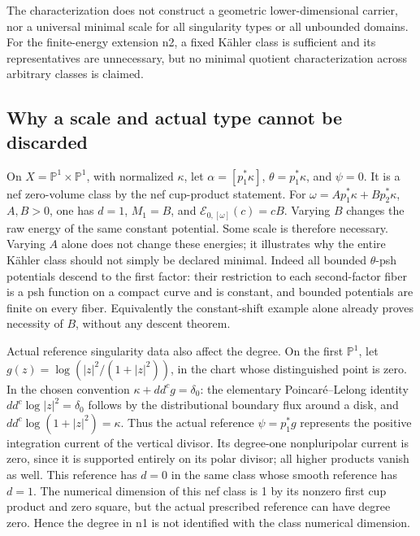 \documentclass[
  11pt,
]{article}
\begin{document}
The characterization does not construct a geometric lower-dimensional
carrier, nor a universal minimal scale for all singularity types or all
unbounded domains. For the finite-energy extension n2, a fixed Kähler
class is sufficient and its representatives are unnecessary, but no
minimal quotient characterization across arbitrary classes is claimed.

\subsection{Why a scale and actual type cannot be
discarded}\label{why-a-scale-and-actual-type-cannot-be-discarded}

On \(X=\mathbb{P}^1\times\mathbb{P}^1\), with normalized \(\kappa\), let
\(\alpha=[p_1^*\kappa]\), \(\theta=p_1^*\kappa\), and \(\psi=0\). It is
a nef zero-volume class by the nef cup-product statement. For
\(\omega=A p_1^*\kappa+B p_2^*\kappa\), \(A,B>0\), one has \(d=1\),
\(M_1=B\), and \(\mathcal{E}_{0,[\omega]}(c)=cB\). Varying \(B\) changes
the raw energy of the same constant potential. Some scale is therefore
necessary. Varying \(A\) alone does not change these energies; it
illustrates why the entire Kähler class should not simply be declared
minimal. Indeed all bounded \(\theta\)-psh potentials descend to the
first factor: their restriction to each second-factor fiber is a psh
function on a compact curve and is constant, and bounded potentials are
finite on every fiber. Equivalently the constant-shift example alone
already proves necessity of \(B\), without any descent theorem.

Actual reference singularity data also affect the degree. On the first
\(\mathbb{P}^1\), let \(g(z)=\log(|z|^2/(1+|z|^2))\), in the chart whose
distinguished point is zero. In the chosen convention
\(\kappa+dd^cg=\delta_0\): the elementary Poincaré--Lelong identity
\(dd^c\log|z|^2=\delta_0\) follows by the distributional boundary flux
around a disk, and \(dd^c\log(1+|z|^2)=\kappa\). Thus the actual
reference \(\psi=p_1^*g\) represents the positive integration current of
the vertical divisor. Its degree-one nonpluripolar current is zero,
since it is supported entirely on its polar divisor; all higher products
vanish as well. This reference has \(d=0\) in the same class whose
smooth reference has \(d=1\). The numerical dimension of this nef class
is 1 by its nonzero first cup product and zero square, but the actual
prescribed reference can have degree zero. Hence the degree in n1 is not
identified with the class numerical dimension.
\end{document}

